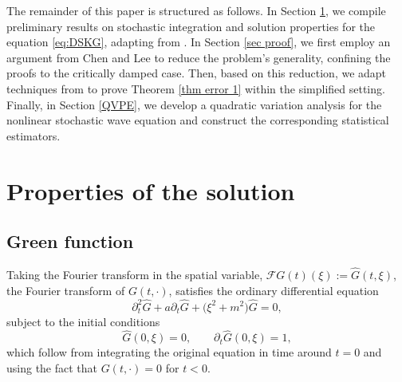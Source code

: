 \documentclass[11pt,reqno]{amsart}
\numberwithin{equation}{section}
\newcommand{\1}{{\bf 1}}
\newcommand{\2}{{\bf 2}}
\begin{document}
 

The remainder of this paper is structured as follows.   In Section \ref{Sec 2}, we compile preliminary results on stochastic integration and  solution properties for  the equation \eqref{eq:DSKG}, adapting  from \cite{D99,DKMNX09,DM03}.   In Section \ref{sec proof}, we first employ an argument from Chen and Lee \cite{CL25} to reduce the problem’s generality, confining the proofs to the critically damped case. Then, based on this reduction, we adapt techniques from \cite{HOO2024} to prove Theorem \ref{thm error 1} within the simplified setting. 
 Finally,  in Section \ref{QVPE}, we develop a quadratic variation analysis for the nonlinear stochastic wave equation and construct the corresponding statistical estimators.
      
 \section{Properties of the  solution}\label{Sec 2}
 \subsection{Green function}
       Taking the Fourier transform in the  spatial variable,    $\mathscr F{G}(t)(\xi):=\hat G(t, \xi)$, the Fourier transform of $G(t, \cdot)$, satisfies the ordinary differential equation
\begin{equation}\label{eq:ODE}
\partial_t^2\hat G  + a\partial_t\hat G  + \bigl(\xi^2+m^2\bigr)\hat G = 0,
\end{equation}
subject to the initial conditions
$$
\hat G(0, \xi)=0,\qquad \partial_t\hat G (0, \xi)=1,
$$  
which  follow from  integrating the original equation in time around $t=0$ and using the fact that $G(t,\cdot)=0$ for $t<0$. 
\end{document}
